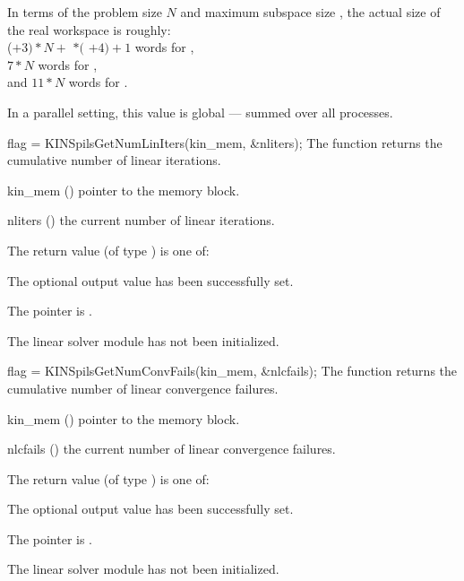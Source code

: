 {
  In terms of the problem size $N$ and maximum subspace size , 
  the actual size of the real workspace is roughly:\\
  ($+ 3)*N +$  $*($ $ + 4) + 1$ 
  words for {\kinspgmr},\\
  $7*N$  words for {\kinspbcg},\\
  and $11*N$  words for {\kinsptfqmr}.

  In a parallel setting, this value is global --- summed over all processes.
}
{
  flag = KINSpilsGetNumLinIters(kin\_mem, \&nliters);
}
{
  The function  returns the
  cumulative number of linear iterations.
}
{
  \begin{args}
  \item[kin\_mem] ()
    pointer to the {\kinsol} memory block.
  \item[nliters] ()
    the current number of linear iterations.
  \end{args}
}
{
  The return value  (of type ) is one of:
  \begin{args}
  \item[\Id{KINSPILS\_SUCCESS}] 
    The optional output value has been successfully set.
  \item[\Id{KINSPILS\_MEM\_NULL}]
    The  pointer is .
  \item[\Id{KINSPLIS\_LMEM\_NULL}]
    The linear solver module has not been initialized.
  \end{args}
}
{}
{
  flag = KINSpilsGetNumConvFails(kin\_mem, \&nlcfails);
}
{
  The function  returns the
  cumulative number of linear convergence failures.
}
{
  \begin{args}
  \item[kin\_mem] ()
    pointer to the {\kinsol} memory block.
  \item[nlcfails] ()
    the current number of linear convergence failures.
  \end{args}
}
{
  The return value  (of type ) is one of:
  \begin{args}
  \item[\Id{KINSPILS\_SUCCESS}] 
    The optional output value has been successfully set.
  \item[\Id{KINSPILS\_MEM\_NULL}]
    The  pointer is .
  \item[\Id{KINSPILS\_LMEM\_NULL}]
    The linear solver module has not been initialized.
  \end{args}
}
